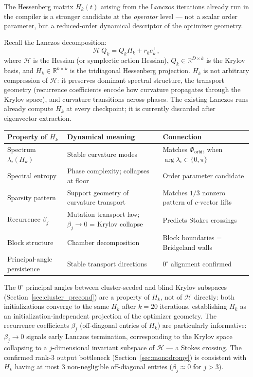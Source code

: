 \documentclass[11pt]{amsart}
\begin{document}
The Hessenberg matrix $H_k(t)$ arising from the Lanczos iterations
already run in the compiler is a stronger candidate at the
\emph{operator} level --- not a scalar order parameter, but a
reduced-order dynamical descriptor of the optimizer geometry.

Recall the Lanczos decomposition:
\[
  \mathcal{H}\, Q_k = Q_k H_k + r_k e_k^\top,
\]
where $\mathcal{H}$ is the Hessian (or symplectic action Hessian),
$Q_k \in \mathbb{R}^{D \times k}$ is the Krylov basis, and
$H_k \in \mathbb{R}^{k \times k}$ is the tridiagonal Hessenberg
projection.
$H_k$ is not arbitrary compression of $\mathcal{H}$: it preserves
dominant spectral structure, the transport geometry
(recurrence coefficients encode how curvature propagates through
the Krylov space), and curvature transitions across phases.
The existing Lanczos runs already compute $H_k$ at every checkpoint;
it is currently discarded after eigenvector extraction.

\begin{center}
\footnotesize
\begin{tabular}{@{}lp{4.8cm}p{3.2cm}@{}}
\toprule
Property of $H_k$ & Dynamical meaning & Connection \\
\midrule
Spectrum $\lambda_i(H_k)$
  & Stable curvature modes
  & Matches $\Phi_\mathrm{orbit}$ when
    $\arg\lambda_i \in \{0,\pi\}$ \\
Spectral entropy
  & Phase complexity; collapses at floor
  & Order parameter candidate \\
Sparsity pattern
  & Support geometry of curvature transport
  & Matches $1/3$ nonzero pattern
    of $c$-vector lifts \\
Recurrence $\beta_j$
  & Mutation transport law;
    $\beta_j\to 0$ = Krylov collapse
  & Predicts Stokes crossings \\
Block structure
  & Chamber decomposition
  & Block boundaries = Bridgeland walls \\
Principal-angle persistence
  & Stable transport directions
  & $0^\circ$ alignment confirmed \\
\bottomrule
\end{tabular}
\end{center}

The $0^\circ$ principal angles between cluster-seeded and blind
Krylov subspaces (Section~\ref{sec:cluster_precond}) are a property
of $H_k$, not of $\mathcal{H}$ directly: both initializations
converge to the same $H_k$ after $k=20$ iterations, establishing
$H_k$ as an initialization-independent projection of the optimizer
geometry.
The recurrence coefficients $\beta_j$ (off-diagonal entries of $H_k$)
are particularly informative: $\beta_j \to 0$ signals early Lanczos
termination, corresponding to the Krylov space collapsing to a
$j$-dimensional invariant subspace of $\mathcal{H}$ --- a Stokes
crossing.
The confirmed rank-3 output bottleneck (Section~\ref{sec:monodromy})
is consistent with $H_k$ having at most 3 non-negligible
off-diagonal entries ($\beta_j \approx 0$ for $j > 3$).
\end{document}
